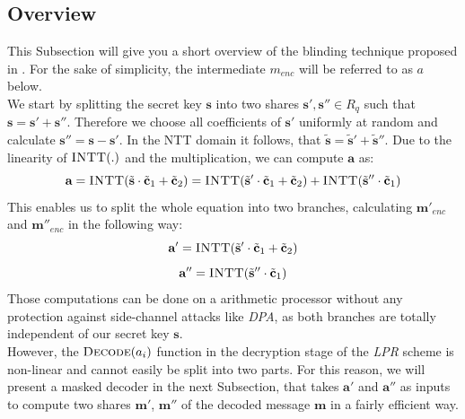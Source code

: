 \subsection{Overview}
This Subsection will give you a short overview of the blinding technique proposed in \cite{maskedRing}.  For the sake of simplicity, the intermediate \(m_{enc}\) will be referred to as \(a\) below.\\
We start by splitting the secret key \(\textbf{s}\) into two shares \(\textbf{s}',\textbf{s}'' \in R_q\) such that \(\textbf{s}=\textbf{s}'+\textbf{s}''\). Therefore we choose all coefficients of \(\textbf{s}'\) uniformly at random and calculate \(\textbf{s}''=\textbf{s}-\textbf{s}'\). In the NTT domain it follows, that \(\tilde{\textbf{s}}=\tilde{\textbf{s}}'+\tilde{\textbf{s}}''\). Due to the linearity of \(\textsc{INTT}(.)\) and the multiplication, we can compute \(\textbf{a}\) as:
\begin{equation}
	\textbf{a}=\textsc{INTT}(\tilde{\textbf{s}} \cdot \tilde{\textbf{c}}_1+\tilde{\textbf{c}}_2)=\textsc{INTT}(\tilde{\textbf{s}}' \cdot \tilde{\textbf{c}}_1+\tilde{\textbf{c}}_2)+\textsc{INTT}(\tilde{\textbf{s}}'' \cdot \tilde{\textbf{c}}_1)
\end{equation}
This enables us to split the whole equation into two branches, calculating \(\textbf{m}'_{enc}\) and \(\textbf{m}''_{enc}\) in the following way:
\begin{equation}
	\textbf{a}'=\textsc{INTT}(\tilde{\textbf{s}}' \cdot \tilde{\textbf{c}}_1+\tilde{\textbf{c}}_2)
\end{equation}
\begin{equation}
	\textbf{a}''=\textsc{INTT}(\tilde{\textbf{s}}'' \cdot \tilde{\textbf{c}}_1)
\end{equation}
Those computations can be done on a arithmetic processor without any protection against side-channel attacks like \textit{DPA}, as both branches are totally independent of our secret key \(\textbf{s}\).\\
However, the \(\textsc{Decode}(a_{i})\) function in the decryption stage of the \textit{LPR} scheme is non-linear and cannot easily be split into two parts. For this reason, we will present a masked decoder in the next Subsection, that takes \(\textbf{a}'\) and \(\textbf{a}''\) as inputs to compute two shares \(\textbf{m}'\), \(\textbf{m}''\) of the decoded message \(\textbf{m}\) in a fairly efficient way.

